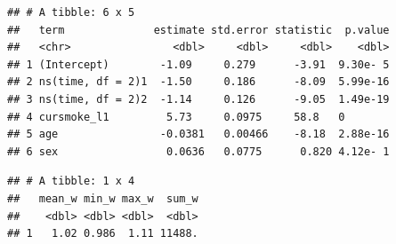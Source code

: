 \documentclass[
]{book}
\newenvironment{Shaded}{\begin{snugshade}}{\end{snugshade}}
\newcommand{\CommentTok}[1]{\textcolor[rgb]{0.56,0.35,0.01}{\textit{#1}}}
\newcommand{\DataTypeTok}[1]{\textcolor[rgb]{0.13,0.29,0.53}{#1}}
\newcommand{\DecValTok}[1]{\textcolor[rgb]{0.00,0.00,0.81}{#1}}
\newcommand{\KeywordTok}[1]{\textcolor[rgb]{0.13,0.29,0.53}{\textbf{#1}}}
\newcommand{\NormalTok}[1]{#1}
\newcommand{\OperatorTok}[1]{\textcolor[rgb]{0.81,0.36,0.00}{\textbf{#1}}}
\newcommand{\StringTok}[1]{\textcolor[rgb]{0.31,0.60,0.02}{#1}}
\begin{document}
\begin{verbatim}
## # A tibble: 6 x 5
##   term              estimate std.error statistic  p.value
##   <chr>                <dbl>     <dbl>     <dbl>    <dbl>
## 1 (Intercept)        -1.09     0.279      -3.91  9.30e- 5
## 2 ns(time, df = 2)1  -1.50     0.186      -8.09  5.99e-16
## 3 ns(time, df = 2)2  -1.14     0.126      -9.05  1.49e-19
## 4 cursmoke_l1         5.73     0.0975     58.8   0       
## 5 age                -0.0381   0.00466    -8.18  2.88e-16
## 6 sex                 0.0636   0.0775      0.820 4.12e- 1
\end{verbatim}

\begin{Shaded}
\end{Shaded}

\begin{verbatim}
## # A tibble: 1 x 4
##   mean_w min_w max_w  sum_w
##    <dbl> <dbl> <dbl>  <dbl>
## 1   1.02 0.986  1.11 11488.
\end{verbatim}
\end{document}
